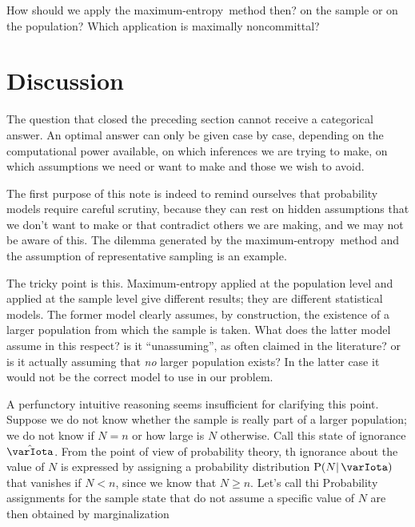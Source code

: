 \documentclass{article}
\theoremstyle{remark}
\theoremstyle{innote}
\renewcommand*{\|}{\mathpunct{|}}%
\renewcommand{\ge}{\geqslant}%
\newcommand*{\p}{\mathrm{P}}%
\theoremstyle{simple}
\newcommand*{\yH}{\varIota}
\newcommand*{\yHd}{\Hat{\varIota}}
\newcommand*{\me}{maximum-entropy}
\begin{document}
\bigskip

How should we apply the \me\ method then? on the sample or on the
population? Which application is maximally noncommittal?

\section{Discussion}
\label{sec:discussion}

The question that closed the preceding section cannot receive a categorical
answer. An optimal answer can only be given case by case, depending on the
computational power available, on which inferences we are trying to make,
on which assumptions we need or want to make and those we wish to avoid.

The first purpose of this note is indeed to remind ourselves that
probability models require careful scrutiny, because they can rest on
hidden assumptions that we don't want to make or that contradict others we
are making, and we may not be aware of this. The dilemma generated by the
\me\ method and the assumption of representative sampling is an example.

The tricky point is this. Maximum-entropy applied at the population level
and applied at the sample level give different results; they are different
statistical models. The former model clearly assumes, by construction, the
existence of a larger population from which the sample is taken. What does
the latter model assume in this respect? is it \enquote{unassuming}, as
often claimed in the literature? or is it actually assuming that \emph{no}
larger population exists? In the latter case it would not be the correct
model to use in our problem.

A perfunctory intuitive reasoning seems insufficient for clarifying this
point. Suppose we do not know whether the sample is really part of a larger
population; we do not know if $N=n$ or how large is $N$ otherwise. Call
this state of ignorance $\yHd$. From the
point of view of probability theory, th
 ignorance about the
value of $N$ is expressed by assigning a probability distribution
$\p(N \| \yH)$ that vanishes if $N<n$, since we know that $N\ge n$. Let's
call thi
Probability assignments for the sample state that do not assume a specific
value of $N$ are then obtained by marginalization
\end{document}
